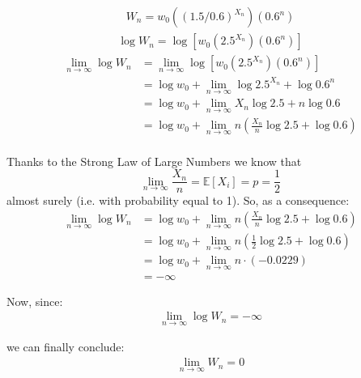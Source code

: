 \documentclass[12pt]{article}
\begin{document}
\begin{align}
    \begin{equation*}
        W_n = w_0 \left((1.5/0.6)^{X_n}\right) \left(0.6^{n}\right)
    \end{equation*}
\end{align}
\begin{align}
    \begin{equation*}
        \log{W_n} = \log{\left[w_0 \left(2.5^{X_n}\right) \left(0.6^{n}\right)\right]}
  \end{equation*}    
\end{align}
\begin{equation*}
  \begin{split}
     \lim_{n\to\infty} \log{W_n} &= \lim_{n\to\infty} \log{\left[w_0 \left(2.5^{X_n}\right) \left(0.6^{n}\right)\right]}\\
    &= \log{w_0} + \lim_{n\to\infty} \log{2.5^{X_n}} + \log{0.6^{n}}\\
    &= \log{w_0} + \lim_{n\to\infty} X_n \log{2.5} + n \log{0.6}\\
    &= \log{w_0} + \lim_{n\to\infty} n (\tfrac{X_n}{n} \log{2.5} + \log{0.6})\\
  \end{split}
\end{equation*}

Thanks to the Strong Law of Large Numbers we know that $$\lim_{n\to\infty}{\frac{X_n}{n} = \mathbb{E}[X_i] = p = \frac{1}{2}}$$ almost surely (i.e. with probability equal to 1). So, as a consequence:
\begin{equation*}
  \begin{split}
      \lim_{n\to\infty} \log{W_n} &= \log{w_0} + \lim_{n\to\infty} n (\tfrac{X_n}{n} \log{2.5} + \log{0.6}) \\
      &= \log{w_0} + \lim_{n\to\infty} n (\tfrac{1}{2} \log{2.5} + \log{0.6}) \\
      &= \log{w_0} + \lim_{n\to\infty} n \cdot(-0.0229) \\
      &= -\infty
  \end{split}
\end{equation*}

Now, since:
\begin{align*}
    \begin{equation*}
        \lim_{n\to\infty} \log{W_n} = -\infty
    \end{equation*}    
\end{align*}

we can finally conclude:
\begin{align}
    \begin{equation*}
        \lim_{n\to\infty} {W_n} = 0
    \end{equation*}    
\end{align}
\end{document}
